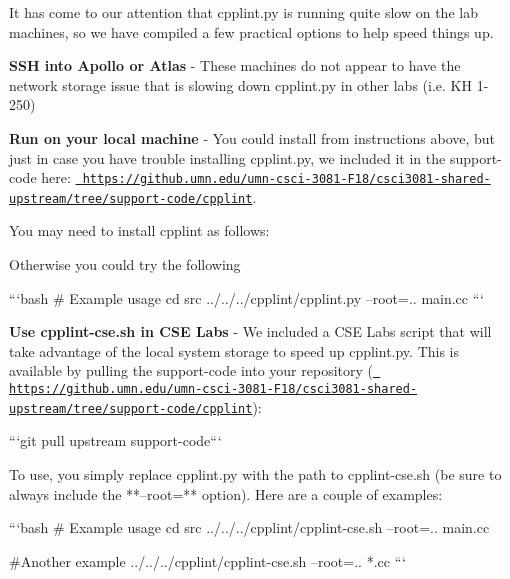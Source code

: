It has come to our attention that cpplint.\+py is running quite slow on the lab machines, so we have compiled a few practical options to help speed things up.


\begin{DoxyEnumerate}
\item {\bfseries{S\+SH into Apollo or Atlas}} -\/ These machines do not appear to have the network storage issue that is slowing down cpplint.\+py in other labs (i.\+e. KH 1-\/250)
\item {\bfseries{Run on your local machine}} -\/ You could install from instructions above, but just in case you have trouble installing cpplint.\+py, we included it in the support-\/code here\+: \href{https://github.umn.edu/umn-csci-3081-F18/csci3081-shared-upstream/tree/support-code/cpplint}{\texttt{ https\+://github.\+umn.\+edu/umn-\/csci-\/3081-\/\+F18/csci3081-\/shared-\/upstream/tree/support-\/code/cpplint}}.
\end{DoxyEnumerate}

You may need to install cpplint as follows\+:


\begin{DoxyCode}{0}
\end{DoxyCode}


Otherwise you could try the following \begin{DoxyVerb}```bash
# Example usage
cd src
../../../cpplint/cpplint.py --root=.. main.cc
```
\end{DoxyVerb}



\begin{DoxyEnumerate}
\item {\bfseries{Use cpplint-\/cse.\+sh in C\+SE Labs}} -\/ We included a C\+SE Labs script that will take advantage of the local system storage to speed up cpplint.\+py. This is available by pulling the support-\/code into your repository (\href{https://github.umn.edu/umn-csci-3081-F18/csci3081-shared-upstream/tree/support-code/cpplint}{\texttt{ https\+://github.\+umn.\+edu/umn-\/csci-\/3081-\/\+F18/csci3081-\/shared-\/upstream/tree/support-\/code/cpplint}})\+: \begin{DoxyVerb}  ```git pull upstream support-code```

  To use, you simply replace cpplint.py with the path to cpplint-cse.sh (be sure to always include the **--root=** option).
  Here are a couple of examples:

 ```bash
 # Example usage
 cd src
 ../../../cpplint/cpplint-cse.sh --root=.. main.cc

 #Another example
 ../../../cpplint/cpplint-cse.sh --root=.. *.cc
 ```
\end{DoxyVerb}

\end{DoxyEnumerate}

